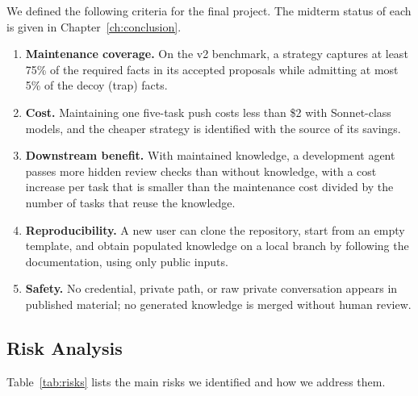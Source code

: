 We defined the following criteria for the final project. The midterm status of each is given in Chapter~\ref{ch:conclusion}.
\begin{enumerate}[nosep]
  \item \textbf{Maintenance coverage.} On the v2 benchmark, a strategy captures at least 75\% of the required facts in its accepted proposals while admitting at most 5\% of the decoy (trap) facts.
  \item \textbf{Cost.} Maintaining one five-task push costs less than \$2 with Sonnet-class models, and the cheaper strategy is identified with the source of its savings.
  \item \textbf{Downstream benefit.} With maintained knowledge, a development agent passes more hidden review checks than without knowledge, with a cost increase per task that is smaller than the maintenance cost divided by the number of tasks that reuse the knowledge.
  \item \textbf{Reproducibility.} A new user can clone the repository, start from an empty template, and obtain populated knowledge on a local branch by following the documentation, using only public inputs.
  \item \textbf{Safety.} No credential, private path, or raw private conversation appears in published material; no generated knowledge is merged without human review.
\end{enumerate}

\subsection{Risk Analysis}

Table~\ref{tab:risks} lists the main risks we identified and how we address them.

